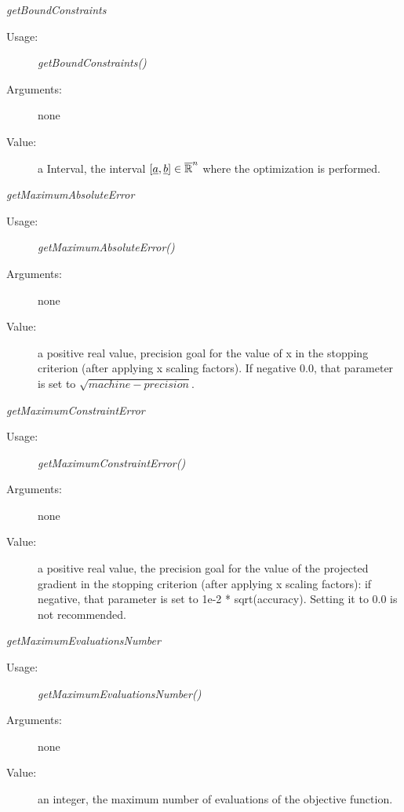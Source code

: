 \begin{description}
\item[Some methods:]  \rule{0pt}{1em}

  \begin{description}

  \item \textit{getBoundConstraints}
    \begin{description}
    \item[Usage:] \textit{getBoundConstraints()}
    \item[Arguments:] none
    \item[Value:]  a Interval, the interval $[{\underline{a}},{\underline{b}}] \in \overline{{\mathbb R}}^n$ where the optimization is performed.
    \end{description}
    \bigskip

  \item \textit{getMaximumAbsoluteError}
    \begin{description}
    \item[Usage:] \textit{getMaximumAbsoluteError()}
    \item[Arguments:] none
    \item[Value:] a positive real value, precision goal for the value of x in the stopping criterion (after applying x scaling factors). If negative 0.0, that parameter is set to $\sqrt{machine-precision}$.
    \end{description}
    \bigskip

  \item \textit{getMaximumConstraintError}
    \begin{description}
    \item[Usage:] \textit{getMaximumConstraintError()}
    \item[Arguments:] none
    \item[Value:] a positive real value, the precision goal for the value of the projected gradient in the stopping criterion (after applying x scaling factors): if negative, that parameter is set to 1e-2 * sqrt(accuracy). Setting it to 0.0 is not recommended.
    \end{description}
    \bigskip

  \item \textit{getMaximumEvaluationsNumber}
    \begin{description}
    \item[Usage:] \textit{getMaximumEvaluationsNumber()}
    \item[Arguments:] none
    \item[Value:] an integer, the maximum number of evaluations of the objective function.
    \end{description}
    \bigskip


\end{description}
\end{description}
